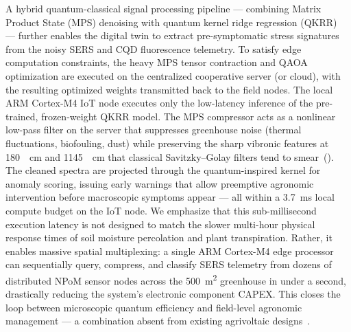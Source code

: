\documentclass[onecolumn,a4paper,12pt]{article}
\begin{document}
A hybrid quantum-classical signal processing pipeline --- combining Matrix Product State (MPS) denoising with quantum kernel ridge regression (QKRR)~\cite{Stoudenmire2016,Havlicek2019} --- further enables the digital twin to extract pre-symptomatic stress signatures from the noisy SERS and CQD fluorescence telemetry. To satisfy edge computation constraints, the heavy MPS tensor contraction and QAOA optimization are executed on the centralized cooperative server (or cloud), with the resulting optimized weights transmitted back to the field nodes. The local ARM Cortex-M4 IoT node executes only the low-latency inference of the pre-trained, frozen-weight QKRR model. The MPS compressor acts as a nonlinear low-pass filter on the server that suppresses greenhouse noise (thermal fluctuations, biofouling, dust) while preserving the sharp vibronic features at \qty{180}{\per\cm} and \qty{1145}{\per\cm} that classical Savitzky--Golay filters tend to smear~(). The cleaned spectra are projected through the quantum-inspired kernel for anomaly scoring, issuing early warnings that allow preemptive agronomic intervention before macroscopic symptoms appear --- all within a \qty{3.7}{\milli\second} local compute budget on the IoT node. We emphasize that this sub-millisecond execution latency is not designed to match the slower multi-hour physical response times of soil moisture percolation and plant transpiration. Rather, it enables massive spatial multiplexing: a single ARM Cortex-M4 edge processor can sequentially query, compress, and classify SERS telemetry from dozens of distributed NPoM sensor nodes across the \qty{500}{\m\squared} greenhouse in under a second, drastically reducing the system's electronic component CAPEX.
This closes the loop between microscopic quantum efficiency and field-level agronomic management --- a combination absent from existing agrivoltaic designs~\cite{Ringstrom2026,Thompson2020,Dupraz2011}.
\end{document}
